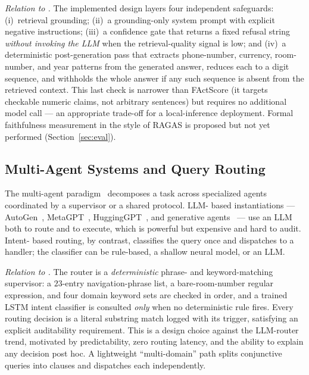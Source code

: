 \emph{Relation to \system{}.} The implemented design layers four
independent safeguards: (i)~retrieval grounding; (ii)~a grounding-only
system prompt with explicit negative instructions; (iii)~a confidence gate
that returns a fixed refusal string \emph{without invoking the LLM} when
the retrieval-quality signal is low; and (iv)~a deterministic
post-generation pass that extracts phone-number, currency, room-number, and
year patterns from the generated answer, reduces each to a digit sequence,
and withholds the whole answer if any such sequence is absent from the
retrieved context. This last check is narrower than FActScore (it targets
checkable numeric claims, not arbitrary sentences) but requires no
additional model call --- an appropriate trade-off for a local-inference
deployment. Formal faithfulness measurement in the style of RAGAS is
proposed but not yet performed (Section~\ref{sec:eval}).

\subsection{Multi-Agent Systems and Query Routing}
The multi-agent paradigm~\cite{wooldridge2009mas} decomposes a task across
specialized agents coordinated by a supervisor or a shared protocol. LLM-
based instantiations --- AutoGen~\cite{wu2023autogen},
MetaGPT~\cite{hong2024metagpt}, HuggingGPT~\cite{shen2023hugginggpt}, and
generative agents~\cite{park2023generative} --- use an LLM both to route
and to execute, which is powerful but expensive and hard to audit. Intent-
based routing, by contrast, classifies the query once and dispatches to a
handler; the classifier can be rule-based, a shallow neural model, or an
LLM.

\emph{Relation to \system{}.} The router is a \emph{deterministic}
phrase- and keyword-matching supervisor: a $23$-entry navigation-phrase
list, a bare-room-number regular expression, and four domain keyword sets
are checked in order, and a trained LSTM intent classifier is consulted
\emph{only} when no deterministic rule fires. Every routing decision is a
literal substring match logged with its trigger, satisfying an explicit
auditability requirement. This is a design choice against the LLM-router
trend, motivated by predictability, zero routing latency, and the ability
to explain any decision post hoc. A lightweight ``multi-domain'' path
splits conjunctive queries into clauses and dispatches each independently.


